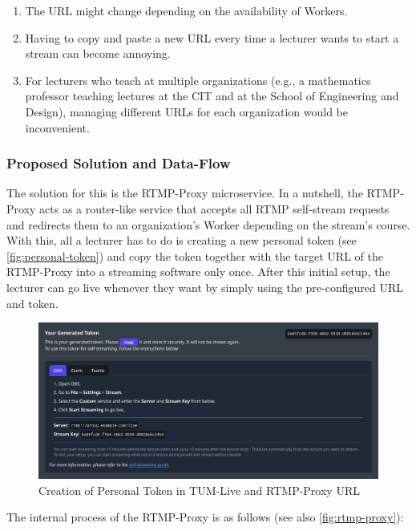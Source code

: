 \begin{enumerate}
    \item The URL might change depending on the availability of Workers.
    \item Having to copy and paste a new URL every time a lecturer wants to start a stream can become annoying.
    \item For lecturers who teach at multiple organizations (e.g., a mathematics professor teaching lectures at the \ac{CIT} and at the School of Engineering and Design), managing different URLs for each organization would be inconvenient.
\end{enumerate}

\subsubsection{Proposed Solution and Data-Flow}

The solution for this is the RTMP-Proxy microservice. In a nutshell, the RTMP-Proxy acts as a router-like service that accepts all \ac{RTMP} self-stream requests and redirects them to an organization's Worker depending on the stream's course. With this, all a lecturer has to do is creating a new personal token (see \autoref{fig:personal-token}) and copy the token together with the target URL of the RTMP-Proxy into a streaming software only once.
After this initial setup, the lecturer can go live whenever they want by simply using the pre-configured URL and token.

\begin{figure}[htpb]
    \centering
    \includegraphics[width=\textwidth]{images/PersonalToken.png}
    \caption[Creation of Personal Token in TUM-Live and RTMP-Proxy URL]{Creation of Personal Token in TUM-Live and RTMP-Proxy URL}\label{fig:personal-token}
\end{figure}


The internal process of the RTMP-Proxy is as follows (see also \autoref{fig:rtmp-proxy}): 

